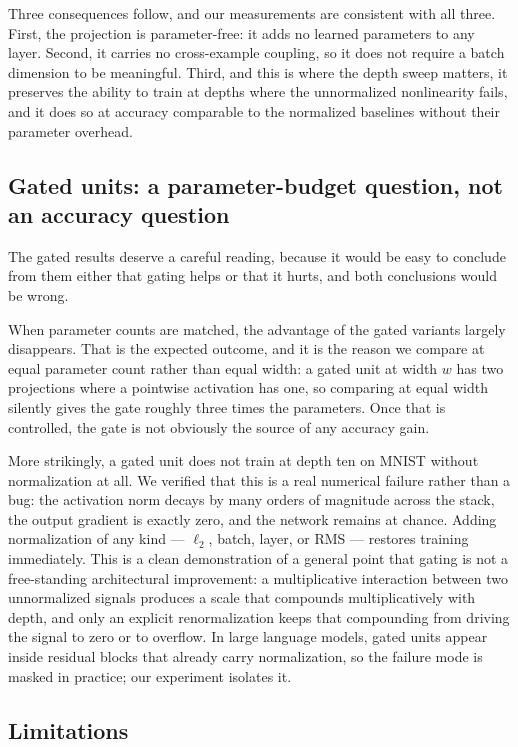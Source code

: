 Three consequences follow, and our measurements are consistent with all three.
First, the projection is parameter-free: it adds no learned parameters to any
layer. Second, it carries no cross-example coupling, so it does not require a
batch dimension to be meaningful. Third, and this is where the depth sweep
matters, it preserves the ability to train at depths where the unnormalized
nonlinearity fails, and it does so at accuracy comparable to the normalized
baselines without their parameter overhead.

\subsection{Gated units: a parameter-budget question, not an accuracy question}

The gated results deserve a careful reading, because it would be easy to
conclude from them either that gating helps or that it hurts, and both
conclusions would be wrong.

When parameter counts are matched, the advantage of the gated variants largely
disappears. That is the expected outcome, and it is the reason we compare at
equal parameter count rather than equal width: a gated unit at width $w$ has
two projections where a pointwise activation has one, so comparing at equal
width silently gives the gate roughly three times the parameters. Once that
is controlled, the gate is not obviously the source of any accuracy gain.

More strikingly, a gated unit does not train at depth ten on MNIST without
normalization at all. We verified that this is a real numerical failure rather
than a bug: the activation norm decays by many orders of magnitude across the
stack, the output gradient is exactly zero, and the network remains at chance.
Adding normalization of any kind --- $\ell_2$, batch, layer, or RMS ---
restores training immediately. This is a clean demonstration of a general
point that gating is not a free-standing architectural improvement: a
multiplicative interaction between two unnormalized signals produces a scale
that compounds multiplicatively with depth, and only an explicit
renormalization keeps that compounding from driving the signal to zero or to
overflow. In large language models, gated units appear inside residual blocks
that already carry normalization, so the failure mode is masked in practice;
our experiment isolates it.

\subsection{Limitations}

